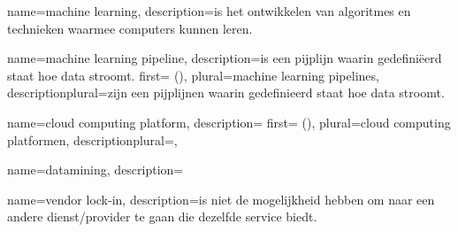 {
    name=machine learning,
    description={is het ontwikkelen van algoritmes en technieken waarmee computers kunnen leren.}
}

{
    name=machine learning pipeline,
    description={is een pijplijn waarin gedefiniëerd staat hoe data stroomt.}
    first={ ()},
    plural={machine learning pipelines},
    descriptionplural={zijn een pijplijnen waarin gedefinieerd staat hoe data stroomt.}   
}

{
    name=cloud computing platform,
    description={}
    first={ ()},
    plural={cloud computing platformen},
    descriptionplural={},
}

{
    name=datamining,
    description={}
}

{
    name=vendor lock-in,
    description={is niet de mogelijkheid hebben om naar een andere dienst/provider te gaan die dezelfde service biedt.}
}
